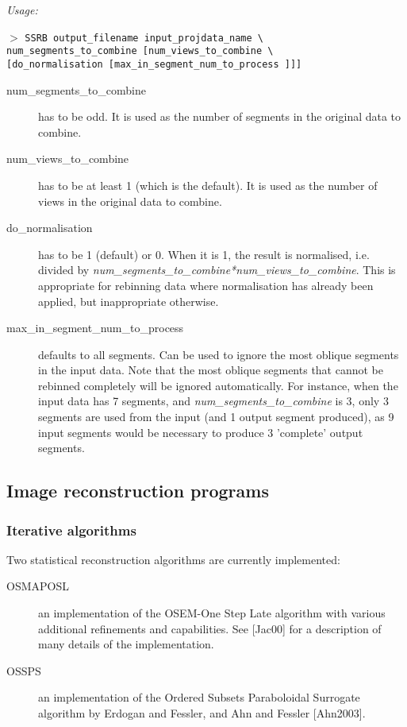 \documentclass{article}
\newcommand{\cmdline}[1]{\par \noindent $>$ \texttt{#1}\par}
\begin{document}
\textit{Usage:}

\cmdline{SSRB output\_filename input\_projdata\_name {\textbackslash} \\
num\_segments\_to\_combine [num\_views\_to\_combine {\textbackslash}\\
{[}do\_normalisation [max\_in\_segment\_num\_to\_process ]]]}

\begin{description}
\item[num\_segments\_to\_combine] has to be odd. It is used as the 
number of segments in the original data to combine.
\item[num\_views\_to\_combine] has to be at least 1 (which 
is the default). It is used as the number of views in the original 
data to combine.
\item[do\_normalisation] has to be 1 (default) or 0. When it is 1, 
the result is normalised, i.e. divided by \textit{num\_segments\_to\_combine*num\_views\_to\_combine}. 
This is appropriate for rebinning data where normalisation has 
already been applied, but inappropriate otherwise.

\item[max\_in\_segment\_num\_to\_process] defaults to all segments. 
Can be used to ignore the most oblique segments in the input 
data. Note that the most oblique segments that cannot be rebinned 
completely will be ignored automatically. For instance, when 
the input data has 7 segments, and \textit{num\_segments\_to\_combine} is 
3, only 3 segments are used from the input (and 1 output segment 
produced), as 9 input segments would be necessary to produce 
3 'complete' output segments.
\end{description}


\subsection{
Image reconstruction programs}




\subsubsection{
Iterative algorithms}

Two statistical reconstruction algorithms are currently implemented:
\begin{description}
\item[OSMAPOSL] an implementation 
of the OSEM-One Step Late algorithm with various additional refinements 
and capabilities. See [Jac00] for a description of many details of the
implementation.
\item[OSSPS] an implementation of the Ordered Subsets Paraboloidal
Surrogate algorithm by Erdogan and Fessler, and Ahn and Fessler [Ahn2003]. 
\end{description}
\end{document}
